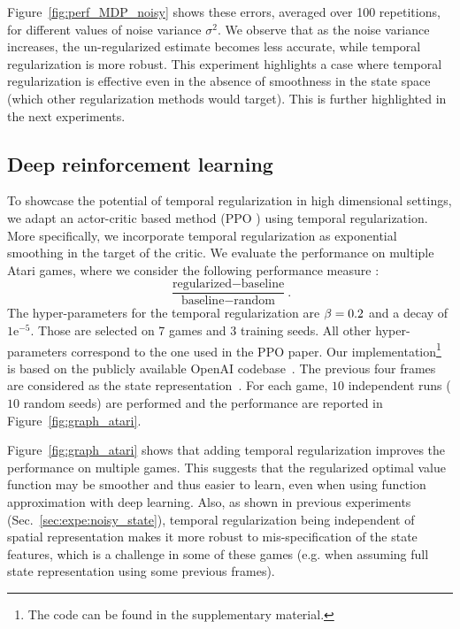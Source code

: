 Figure~\ref{fig:perf_MDP_noisy} shows these errors, averaged over 100 repetitions, for different values of noise variance $\sigma^2$. We observe that as the noise variance increases, the un-regularized estimate becomes less accurate, while temporal regularization is more robust. This experiment highlights a case where temporal regularization is effective even in the absence of smoothness in the state space (which other regularization methods would target). This is further highlighted in the next experiments.



\subsection{Deep reinforcement learning}
\label{sec:expe:drl}

To showcase the potential of temporal regularization in high dimensional settings, we adapt an actor-critic based method (PPO \cite{schulman2017proximal}) using temporal regularization. More specifically, we incorporate temporal regularization as exponential smoothing in the target of the critic. 
We evaluate the performance on multiple Atari games, where we consider the following performance measure \cite{xu2017natural}:
\begin{equation}
\label{eqn:expe:drl_measure}
    \frac{\text{regularized} - \text{baseline}}{\text{baseline} - \text{random}}.
\end{equation}
The hyper-parameters for the temporal regularization are $\beta = 0.2$ and a decay of $1\mathrm{e}^{-5}$. Those are selected on 7 games and 3 training seeds. All other hyper-parameters correspond to the one used in the PPO paper. Our implementation\footnote{The code can be found in the supplementary material.} is based on the publicly available OpenAI codebase~\cite{baselines}. The previous four frames are considered as the state representation~\cite{mnih2015human}.
For each game, $10$ independent runs ($10$ random seeds) are performed and the performance are reported in Figure~\ref{fig:graph_atari}. 


Figure~\ref{fig:graph_atari} shows that adding temporal regularization improves the performance on multiple games. This suggests that the regularized optimal value function may be smoother and thus easier to learn, even when using function approximation with deep learning. Also, as shown in previous experiments (Sec.~\ref{sec:expe:noisy_state}), temporal regularization being independent of spatial representation makes it more robust to mis-specification of the state features, which is a challenge in some of these games (e.g. when assuming full state representation using some previous frames).

